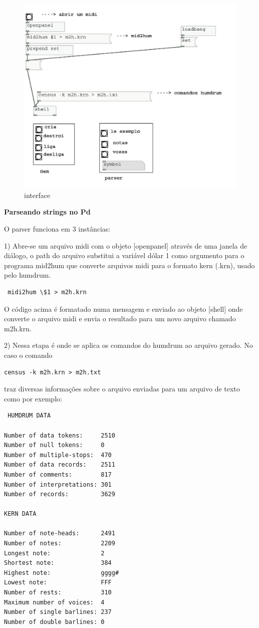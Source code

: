 \documentclass[draft]{ppgmus}
\begin{document}
\begin{figure}
\includegraphics[scale=.7]{interface00}
\caption{interface}
\label{interface}
\end{figure} 

\textbf{Parseando strings no Pd}


O parser funciona em 3 instâncias:

1) Abre-se um arquivo midi com o objeto [openpanel] através
de uma janela de diálogo, o path do arquivo substitui a variável 
dólar 1 como argumento para o programa mid2hum que converte
arquivos midi para o formato kern (.krn), usado pelo humdrum.
\begin{verbatim}
 midi2hum \$1 > m2h.krn
\end{verbatim} 
  O código acima é formatado numa mensagem e enviado ao objeto
[shell] onde converte o arquivo midi e envia o resultado para
um novo arquivo chamado m2h.krn.
 
2) Nessa etapa é onde se aplica os comandos do humdrum ao 
arquivo gerado. No caso o comando
\begin{verbatim}
census -k m2h.krn > m2h.txt
\end{verbatim} 
traz diversas informações sobre o arquivo enviadas para um 
arquivo de texto como por exemplo:
\begin{verbatim}
 HUMDRUM DATA

Number of data tokens:     2510
Number of null tokens:     0
Number of multiple-stops:  470
Number of data records:    2511
Number of comments:        817
Number of interpretations: 301
Number of records:         3629

KERN DATA

Number of note-heads:      2491
Number of notes:           2209
Longest note:              2
Shortest note:             384
Highest note:              gggg#
Lowest note:               FFF
Number of rests:           310
Maximum number of voices:  4
Number of single barlines: 237
Number of double barlines: 0
\end{verbatim} 
\end{document}
